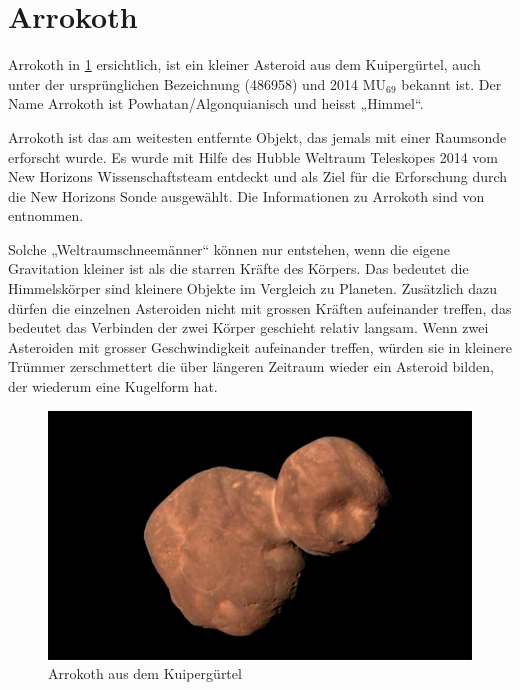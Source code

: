 %
%
%
%
\section{Arrokoth
\label{planet:section:arrokoth}}

Arrokoth in \cref{planet:fig:arrokoth} ersichtlich, ist ein kleiner Asteroid aus dem Kuipergürtel, auch unter der ursprünglichen Bezeichnung (486958) und 2014 \(\text{MU}_{69}\) bekannt ist.
Der Name Arrokoth ist Powhatan/Algonquianisch und heisst „Himmel“.

Arrokoth ist das am weitesten entfernte Objekt, das jemals mit einer Raumsonde erforscht wurde.
Es wurde mit Hilfe des Hubble Weltraum Teleskopes 2014 vom New Horizons Wissenschaftsteam entdeckt und als Ziel für die Erforschung durch die New Horizons Sonde ausgewählt.
Die Informationen zu Arrokoth sind von \cite{planet:arrokoth} entnommen.

Solche „Weltraumschneemänner“ können nur entstehen, wenn die eigene Gravitation kleiner ist als die starren Kräfte des Körpers.
Das bedeutet die Himmelskörper sind kleinere Objekte im Vergleich zu Planeten.
Zusätzlich dazu dürfen die einzelnen Asteroiden nicht mit grossen Kräften aufeinander treffen, das bedeutet das Verbinden der zwei Körper geschieht relativ langsam.
Wenn zwei Asteroiden mit grosser Geschwindigkeit aufeinander treffen, würden sie in kleinere Trümmer zerschmettert die über längeren Zeitraum wieder ein Asteroid bilden, der wiederum eine Kugelform hat.

\begin{figure}[h]
    \centering
    \includegraphics[width=\linewidth]{papers/planet/pictures/Arrokoth.pdf}
    \caption{Arrokoth aus dem Kuipergürtel \cite{planet:arrokothpic}
        \label{planet:fig:arrokoth}}
\end{figure}